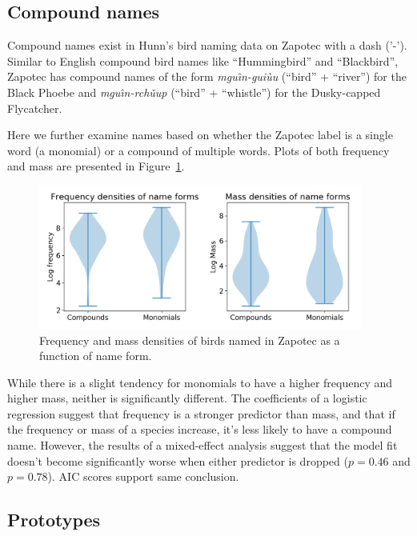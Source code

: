 \documentclass[10pt,letterpaper]{article}
\begin{document}
\subsection{Compound names}

Compound names exist in Hunn's bird naming data on Zapotec with a dash ('-'). Similar to English compound bird names like ``Hummingbird'' and ``Blackbird'', Zapotec has compound names of the form \textit{mgu\^{\i}n-gui\`{u}u} (``bird'' + ``river'') for the Black Phoebe and \textit{mgu\^{\i}n-rch\v{u}up} (``bird'' + ``whistle'') for the Dusky-capped Flycatcher.

Here we further examine names based on whether the Zapotec label is a single word (a monomial) or a compound of multiple words. Plots of both frequency and mass are presented in Figure~\ref{fig-both-nameforms}. 

\begin{figure}
  \begin{center}
    \includegraphics[width=0.95\textwidth]{./figures/nameforms-both.png}
        \caption{Frequency and mass densities of birds named in Zapotec as a function of name form.}
        \label{fig-both-nameforms}
  \end{center}
\end{figure}

While there is a slight tendency for monomials to have a higher frequency and higher mass, neither is significantly different. The coefficients of a logistic regression suggest that frequency is a stronger predictor than mass, and that if the frequency or mass of a species increase, it’s less likely to have a compound name. However, the results of a mixed-effect analysis suggest that the model fit doesn’t become significantly worse when either predictor is dropped ($p = 0.46$ and $p=0.78$). AIC scores support same conclusion.



\subsection{Prototypes}
\end{document}
